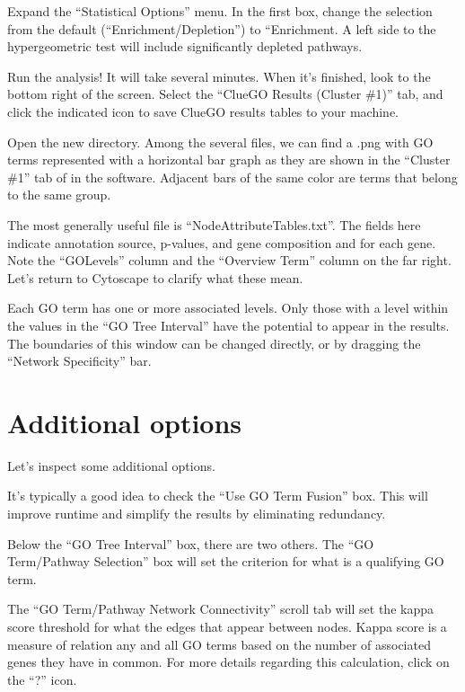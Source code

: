 \documentclass[
]{book}
\begin{document}
Expand the ``Statistical Options'' menu. In the first box, change the selection from the default (``Enrichment/Depletion'') to ``Enrichment. A left side to the hypergeometric test will include significantly depleted pathways.

Run the analysis! It will take several minutes. When it's finished, look to the bottom right of the screen. Select the ``ClueGO Results (Cluster \#1)'' tab, and click the indicated icon to save ClueGO results tables to your machine.

Open the new directory. Among the several files, we can find a .png with GO terms represented with a horizontal bar graph as they are shown in the ``Cluster \#1'' tab of in the software. Adjacent bars of the same color are terms that belong to the same group.

The most generally useful file is ``NodeAttributeTables.txt''. The fields here indicate annotation source, p-values, and gene composition and for each gene. Note the ``GOLevels'' column and the ``Overview Term'' column on the far right. Let's return to Cytoscape to clarify what these mean.

Each GO term has one or more associated levels. Only those with a level within the values in the ``GO Tree Interval'' have the potential to appear in the results. The boundaries of this window can be changed directly, or by dragging the ``Network Specificity'' bar.

\hypertarget{additional-options}{%
\section{Additional options}\label{additional-options}}

Let's inspect some additional options.

It's typically a good idea to check the ``Use GO Term Fusion'' box. This will improve runtime and simplify the results by eliminating redundancy.

Below the ``GO Tree Interval'' box, there are two others. The ``GO Term/Pathway Selection'' box will set the criterion for what is a qualifying GO term.

The ``GO Term/Pathway Network Connectivity'' scroll tab will set the kappa score threshold for what the edges that appear between nodes. Kappa score is a measure of relation any and all GO terms based on the number of associated genes they have in common. For more details regarding this calculation, click on the ``?'' icon.
\end{document}
